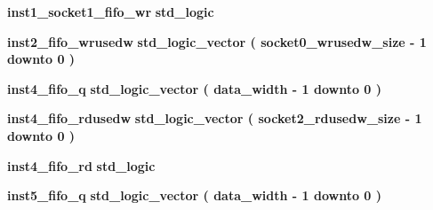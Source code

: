 \begin{DoxyCompactItemize}
\item 
{\bf inst1\+\_\+socket1\+\_\+fifo\+\_\+wr} {\bfseries \textcolor{comment}{std\+\_\+logic}\textcolor{vhdlchar}{ }} 
\item 
{\bf inst2\+\_\+fifo\+\_\+wrusedw} {\bfseries \textcolor{comment}{std\+\_\+logic\+\_\+vector}\textcolor{vhdlchar}{ }\textcolor{vhdlchar}{(}\textcolor{vhdlchar}{ }\textcolor{vhdlchar}{ }\textcolor{vhdlchar}{ }\textcolor{vhdlchar}{ }{\bfseries {\bf socket0\+\_\+wrusedw\+\_\+size}} \textcolor{vhdlchar}{-\/}\textcolor{vhdlchar}{ } \textcolor{vhdldigit}{1} \textcolor{vhdlchar}{ }\textcolor{keywordflow}{downto}\textcolor{vhdlchar}{ }\textcolor{vhdlchar}{ } \textcolor{vhdldigit}{0} \textcolor{vhdlchar}{ }\textcolor{vhdlchar}{)}\textcolor{vhdlchar}{ }} 
\item 
{\bf inst4\+\_\+fifo\+\_\+q} {\bfseries \textcolor{comment}{std\+\_\+logic\+\_\+vector}\textcolor{vhdlchar}{ }\textcolor{vhdlchar}{(}\textcolor{vhdlchar}{ }\textcolor{vhdlchar}{ }\textcolor{vhdlchar}{ }\textcolor{vhdlchar}{ }{\bfseries {\bf data\+\_\+width}} \textcolor{vhdlchar}{-\/}\textcolor{vhdlchar}{ } \textcolor{vhdldigit}{1} \textcolor{vhdlchar}{ }\textcolor{keywordflow}{downto}\textcolor{vhdlchar}{ }\textcolor{vhdlchar}{ } \textcolor{vhdldigit}{0} \textcolor{vhdlchar}{ }\textcolor{vhdlchar}{)}\textcolor{vhdlchar}{ }} 
\item 
{\bf inst4\+\_\+fifo\+\_\+rdusedw} {\bfseries \textcolor{comment}{std\+\_\+logic\+\_\+vector}\textcolor{vhdlchar}{ }\textcolor{vhdlchar}{(}\textcolor{vhdlchar}{ }\textcolor{vhdlchar}{ }\textcolor{vhdlchar}{ }\textcolor{vhdlchar}{ }{\bfseries {\bf socket2\+\_\+rdusedw\+\_\+size}} \textcolor{vhdlchar}{-\/}\textcolor{vhdlchar}{ } \textcolor{vhdldigit}{1} \textcolor{vhdlchar}{ }\textcolor{keywordflow}{downto}\textcolor{vhdlchar}{ }\textcolor{vhdlchar}{ } \textcolor{vhdldigit}{0} \textcolor{vhdlchar}{ }\textcolor{vhdlchar}{)}\textcolor{vhdlchar}{ }} 
\item 
{\bf inst4\+\_\+fifo\+\_\+rd} {\bfseries \textcolor{comment}{std\+\_\+logic}\textcolor{vhdlchar}{ }} 
\item 
{\bf inst5\+\_\+fifo\+\_\+q} {\bfseries \textcolor{comment}{std\+\_\+logic\+\_\+vector}\textcolor{vhdlchar}{ }\textcolor{vhdlchar}{(}\textcolor{vhdlchar}{ }\textcolor{vhdlchar}{ }\textcolor{vhdlchar}{ }\textcolor{vhdlchar}{ }{\bfseries {\bf data\+\_\+width}} \textcolor{vhdlchar}{-\/}\textcolor{vhdlchar}{ } \textcolor{vhdldigit}{1} \textcolor{vhdlchar}{ }\textcolor{keywordflow}{downto}\textcolor{vhdlchar}{ }\textcolor{vhdlchar}{ } \textcolor{vhdldigit}{0} \textcolor{vhdlchar}{ }\textcolor{vhdlchar}{)}\textcolor{vhdlchar}{ }} 

\end{DoxyCompactItemize}
